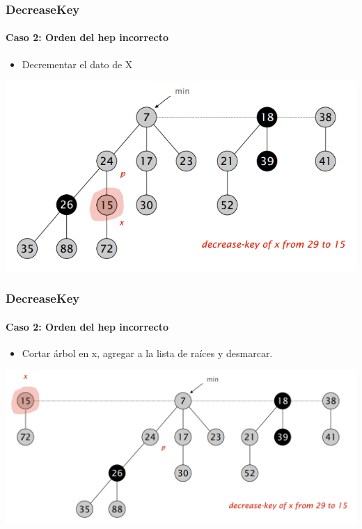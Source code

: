 \documentclass{beamer}
\begin{document}
\begin{frame}
  \frametitle{DecreaseKey}
  \framesubtitle{Caso 2: Orden del hep incorrecto}
  \begin{itemize}
    \item Decrementar el dato de X
  \end{itemize}
     \includegraphics[width =1 \textwidth]{img/decrease/02.png}
\end{frame}


\begin{frame}
  \frametitle{DecreaseKey}
  \framesubtitle{Caso 2: Orden del hep incorrecto}
  \begin{itemize}
    \item Cortar árbol en x, agregar a la lista de raíces y desmarcar.
  \end{itemize}
     \includegraphics[width =1 \textwidth]{img/decrease/03.png}
\end{frame}
\end{document}
